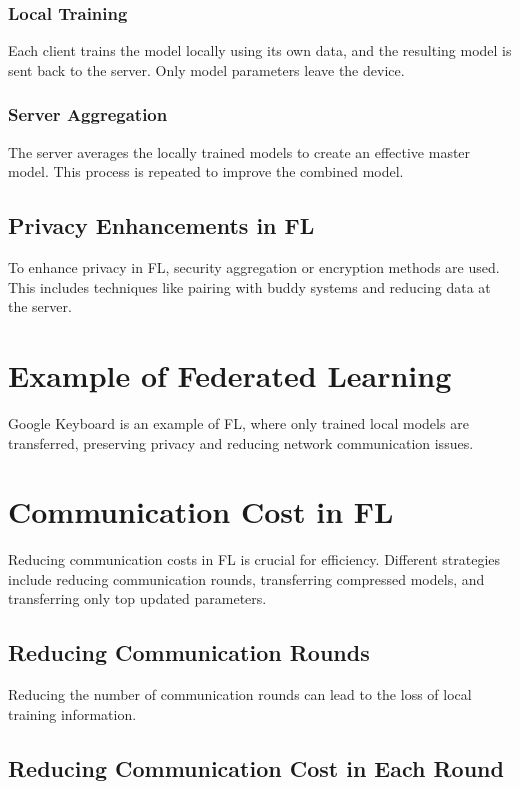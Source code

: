 \documentclass{article}
\begin{document}
\subsubsection{Local Training}

Each client trains the model locally using its own data, and the resulting model is sent back to the server. Only model parameters leave the device.

\subsubsection{Server Aggregation}

The server averages the locally trained models to create an effective master model. This process is repeated to improve the combined model.

\subsection{Privacy Enhancements in FL}

To enhance privacy in FL, security aggregation or encryption methods are used. This includes techniques like pairing with buddy systems and reducing data at the server.

\section{Example of Federated Learning}

Google Keyboard is an example of FL, where only trained local models are transferred, preserving privacy and reducing network communication issues.

\section{Communication Cost in FL}

Reducing communication costs in FL is crucial for efficiency. Different strategies include reducing communication rounds, transferring compressed models, and transferring only top updated parameters.

\subsection{Reducing Communication Rounds}

Reducing the number of communication rounds can lead to the loss of local training information.

\subsection{Reducing Communication Cost in Each Round}
\end{document}
